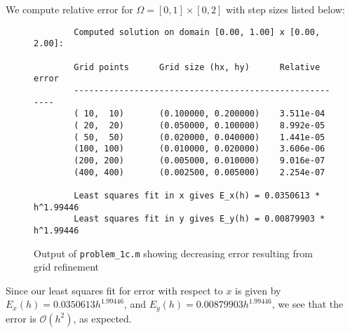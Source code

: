 \begin{solution}\ \\\\
    We compute relative error for $\Omega = [0, 1] \times [0, 2]$ with step sizes listed below:

    \begin{figure}[h]
        \begin{lstlisting}
        Computed solution on domain [0.00, 1.00] x [0.00, 2.00]: 
 
        Grid points      Grid size (hx, hy)      Relative error
        -------------------------------------------------------
        ( 10,  10)       (0.100000, 0.200000)    3.511e-04 
        ( 20,  20)       (0.050000, 0.100000)    8.992e-05 
        ( 50,  50)       (0.020000, 0.040000)    1.441e-05 
        (100, 100)       (0.010000, 0.020000)    3.606e-06 
        (200, 200)       (0.005000, 0.010000)    9.016e-07 
        (400, 400)       (0.002500, 0.005000)    2.254e-07 
             
        Least squares fit in x gives E_x(h) = 0.0350613 * h^1.99446
        Least squares fit in y gives E_y(h) = 0.00879903 * h^1.99446
        \end{lstlisting}
        \caption{Output of \texttt{problem\_1c.m} showing decreasing error resulting from grid refinement}
    \end{figure}

    Since our least squares fit for error with respect to $x$ is given by $E_x(h) = 0.0350613 h^{1.99446}$, and 
    $E_y(h) = 0.00879903 h^{1.99446}$, we see that the error is $\mathcal{O}(h^2)$, as expected.
    \ \\
\end{solution}
